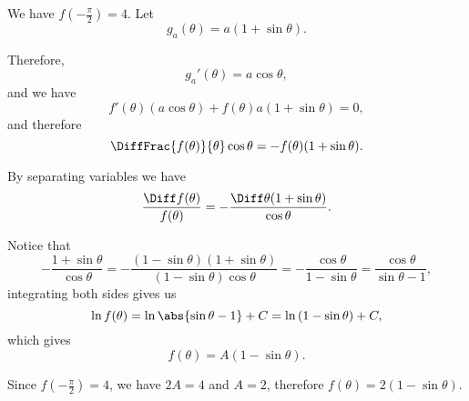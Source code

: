We have \(f\left(-\frac{\pi}{2}\right) = 4\). Let
\[
    g_a(\theta) = a(1 + \sin \theta).
\]

Therefore,
\[
    g_a'(\theta) = a \cos \theta,
\]
and we have
\[
    f'(\theta) (a \cos \theta) + f(\theta) a (1 + \sin \theta) = 0,
\]
and therefore
\[
    \DiffFrac{f(\theta)}{\theta} \cos \theta = - f(\theta) (1 + \sin \theta).
\]

By separating variables we have
\[
    \frac{\Diff f(\theta)}{f(\theta)} = - \frac{\Diff \theta (1 + \sin \theta)}{\cos \theta}.
\]

Notice that
\[
    -\frac{1 + \sin \theta}{\cos \theta} = - \frac{(1 - \sin \theta) (1 + \sin \theta)}{(1 - \sin \theta) \cos \theta} = - \frac{\cos \theta}{1 - \sin \theta} = \frac{\cos \theta}{\sin \theta - 1},
\]
integrating both sides gives us
\[
    \ln f(\theta) = \ln \abs{\sin \theta - 1} + C = \ln \left(1 - \sin \theta\right) + C,
\]
which gives
\[
    f(\theta) = A (1 - \sin \theta).
\]

Since \(f\left(-\frac{\pi}{2}\right) = 4\), we have \(2A = 4\) and \(A = 2\), therefore \(f(\theta) = 2 (1 - \sin \theta)\).

\begin{center}
    
\end{center}